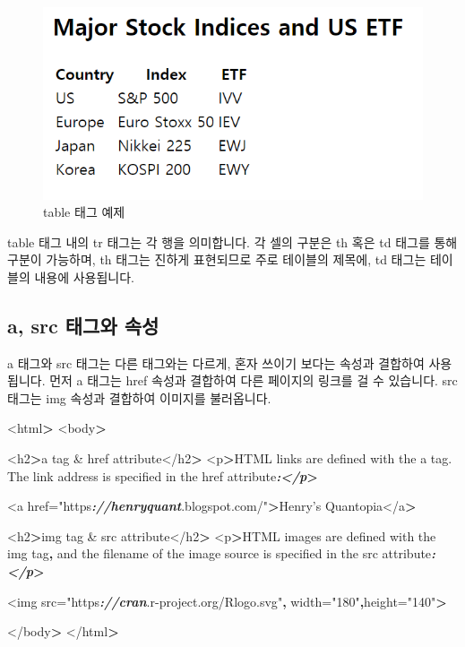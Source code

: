 \documentclass[12pt,]{book}
\newenvironment{Shaded}{\begin{snugshade}}{\end{snugshade}}
\newcommand{\FunctionTok}[1]{\textcolor[rgb]{0.00,0.00,0.00}{#1}}
\newcommand{\InformationTok}[1]{\textcolor[rgb]{0.56,0.35,0.01}{\textbf{\textit{#1}}}}
\newcommand{\NormalTok}[1]{#1}
\newcommand{\OperatorTok}[1]{\textcolor[rgb]{0.81,0.36,0.00}{\textbf{#1}}}
\begin{document}
\begin{figure}[h]

{\centering \includegraphics[width=0.7\linewidth]{images/html_5} 

}

\caption{table 태그 예제}\label{fig:unnamed-chunk-14}
\end{figure}

table 태그 내의 tr 태그는 각 행을 의미합니다. 각 셀의 구분은 th 혹은 td 태그를 통해 구분이 가능하며, th 태그는 진하게 표현되므로 주로 테이블의 제목에, td 태그는 테이블의 내용에 사용됩니다.

\hypertarget{a-src--}{%
\subsection{a, src 태그와 속성}\label{a-src--}}

a 태그와 src 태그는 다른 태그와는 다르게, 혼자 쓰이기 보다는 속성과 결합하여 사용됩니다. 먼저 a 태그는 href 속성과 결합하여 다른 페이지의 링크를 걸 수 있습니다. src 태그는 img 속성과 결합하여 이미지를 불러옵니다.

\begin{Shaded}
\begin{Highlighting}[]
\NormalTok{<html}\OperatorTok{>}
\NormalTok{<body}\OperatorTok{>}

\NormalTok{<h2}\OperatorTok{>}\NormalTok{a tag & href attribute</h2}\OperatorTok{>}
\NormalTok{<p}\OperatorTok{>}\NormalTok{HTML links are defined with the a tag}\FunctionTok{.}
\NormalTok{The link address is specified in the href attribute}\InformationTok{:</p}\OperatorTok{>}

\NormalTok{<a href="https}\InformationTok{://henryquant}\FunctionTok{.blogspot.com}\NormalTok{/"}\OperatorTok{>}\NormalTok{Henry's Quantopia</a}\OperatorTok{>}

\NormalTok{<h2}\OperatorTok{>}\NormalTok{img tag & src attribute</h2}\OperatorTok{>}
\NormalTok{<p}\OperatorTok{>}\NormalTok{HTML images are defined with the img tag}\OperatorTok{,}
\NormalTok{and the filename of the image source is}
\NormalTok{specified in the src attribute}\InformationTok{:</p}\OperatorTok{>}

\NormalTok{<img src="https}\InformationTok{://cran}\FunctionTok{.r-project.org}\NormalTok{/Rlogo}\FunctionTok{.svg}\NormalTok{"}\OperatorTok{,}
\NormalTok{width="180"}\OperatorTok{,}\NormalTok{height="140"}\OperatorTok{>}

\NormalTok{</body}\OperatorTok{>}
\NormalTok{</html}\OperatorTok{>}
\end{Highlighting}
\end{Shaded}
\end{document}
